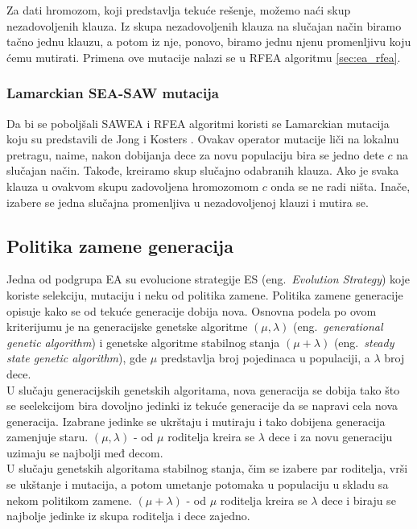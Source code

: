 \documentclass[a4paper]{article}
\begin{document}
Za dati hromozom, koji predstavlja
tekuće rešenje, možemo naći skup nezadovoljenih klauza. 
Iz skupa nezadovoljenih klauza na slučajan način biramo tačno jednu klauzu, 
a potom iz nje, ponovo, biramo jednu njenu promenljivu koju ćemu mutirati. 
Primena ove mutacije nalazi se u RFEA algoritmu \ref{sec:ea_rfea}.

\subsubsection{Lamarckian SEA-SAW mutacija}
\label{sec:ea_lamarckian}
Da bi se poboljšali SAWEA i RFEA algoritmi koristi se Lamarckian mutacija koju su predstavili 
de Jong i Kosters \cite{ea_without_table, ea_with_table}. 
Ovakav operator mutacije liči na lokalnu pretragu, naime, 
nakon dobijanja dece za novu populaciju bira se jedno dete $c$ na slučajan način.
Takođe, kreiramo skup slučajno odabranih klauza. 
Ako je svaka klauza u ovakvom skupu zadovoljena hromozomom $c$ onda se ne radi ništa. 
Inače, izabere se jedna slučajna promenljiva u nezadovoljenoj klauzi i mutira se.


\subsection{Politika zamene generacija}
\label{sec:ea_zamena}
Jedna od podgrupa EA su evolucione strategije ES (eng.~{\em Evolution Strategy}) koje
koriste selekciju, mutaciju i neku od politika zamene.
Politika zamene generacije \cite{vi_Janicic, ea_without_table} opisuje kako se od tekuće
generacije dobija nova. Osnovna podela po ovom kriterijumu je na generacijske genetske
algoritme $(\mu, \lambda)$ (eng.~{\em generational genetic algorithm}) i genetske algoritme
stabilnog stanja $(\mu + \lambda)$ (eng.~{\em steady state genetic algorithm}), gde $\mu$
predstavlja broj pojedinaca u populaciji, a $\lambda$ broj dece. \\
 
U slučaju generacijskih genetskih algoritama, nova generacija se dobija tako što se 
seelekcijom bira dovoljno jedinki iz tekuće generacije da se napravi cela nova generacija.
Izabrane jedinke se ukrštaju i mutiraju i tako dobijena generacija zamenjuje staru.
$(\mu, \lambda)$ - od $\mu$ roditelja kreira se $\lambda$ dece i 
za novu generaciju uzimaju se najbolji međ decom.\\ 
 
U slučaju genetskih algoritama stabilnog stanja, čim se izabere par roditelja, 
vrši se ukštanje i mutacija, a potom umetanje potomaka u populaciju u 
skladu sa nekom politikom zamene. $(\mu + \lambda)$ - od $\mu$ roditelja 
kreira se $\lambda$ dece i biraju se najbolje jedinke iz skupa roditelja i dece zajedno. 
\end{document}
